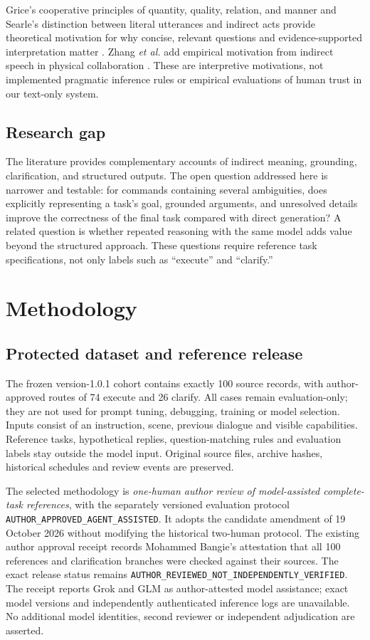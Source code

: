 \documentclass[10pt,conference]{IEEEtran}
\begin{document}
Grice's cooperative principles of quantity, quality, relation, and manner and Searle's distinction between literal utterances and indirect acts provide theoretical motivation for why concise, relevant questions and evidence-supported interpretation matter \cite{grice1975,searle1975}. Zhang \emph{et al.} add empirical motivation from indirect speech in physical collaboration \cite{tool}. These are interpretive motivations, not implemented pragmatic inference rules or empirical evaluations of human trust in our text-only system.

\subsection{Research gap}
The literature provides complementary accounts of indirect meaning, grounding, clarification, and structured outputs. The open question addressed here is narrower and testable: for commands containing several ambiguities, does explicitly representing a task's goal, grounded arguments, and unresolved details improve the correctness of the final task compared with direct generation? A related question is whether repeated reasoning with the same model adds value beyond the structured approach. These questions require reference task specifications, not only labels such as ``execute'' and ``clarify.''


\section{Methodology}
\subsection{Protected dataset and reference release}
The frozen version-1.0.1 cohort contains exactly 100 source records, with author-approved routes of 74 execute and 26 clarify. All cases remain evaluation-only; they are not used for prompt tuning, debugging, training or model selection. Inputs consist of an instruction, scene, previous dialogue and visible capabilities. Reference tasks, hypothetical replies, question-matching rules and evaluation labels stay outside the model input. Original source files, archive hashes, historical schedules and review events are preserved.

The selected methodology is \emph{one-human author review of model-assisted complete-task references}, with the separately versioned evaluation protocol \texttt{AUTHOR\_APPROVED\_AGENT\_ASSISTED}. It adopts the candidate amendment of 19 October 2026 without modifying the historical two-human protocol. The existing author approval receipt records Mohammed Bangie's attestation that all 100 references and clarification branches were checked against their sources. The exact release status remains \texttt{AUTHOR\_REVIEWED\_NOT\_INDEPENDENTLY\_VERIFIED}. The receipt reports Grok and GLM as author-attested model assistance; exact model versions and independently authenticated inference logs are unavailable. No additional model identities, second reviewer or independent adjudication are asserted.
\end{document}
